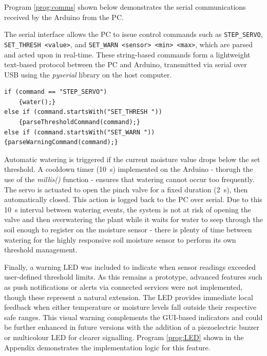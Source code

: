 \documentclass[a4paper,11pt]{article}
\begin{document}
Program \ref{prog:comms} shown below demonstrates the serial communications
received by the Arduino from the PC.

The serial interface allows the PC to issue control commands such as 
\texttt{STEP\_SERVO}, \texttt{SET\_THRESH <value>}, and 
\texttt{SET\_WARN <sensor> <min> <max>}, which are parsed and acted upon 
in real-time.
These string-based commands form a lightweight text-based protocol between 
the PC and Arduino, transmitted via 
serial over USB using the \textit{pyserial} library 
on the host computer. 

\begin{lstlisting}[style=cpp-style, 
caption={Communication with the PC}, label={prog:comms}]
if (command == "STEP_SERVO")
    {water();}
else if (command.startsWith("SET_THRESH "))
    {parseThresholdCommand(command);}
else if (command.startsWith("SET_WARN "))
{parseWarningCommand(command);}
\end{lstlisting}

Automatic watering is triggered if the current moisture value drops below 
the set threshold. A cooldown timer (\SI{10}{\second}) implemented on the Arduino - 
thorugh the use of the \textit{millis()} function -
ensures that watering cannot occur too frequently. 
The servo is actuated to open the 
pinch valve for a fixed duration (\SI{2}{\second}), then automatically closed. 
This action is logged back to the PC over serial.
Due to this \SI{10}{\second} interval between watering events,
the system is not at risk of opening the valve 
and then overwatering the plant while it waits for water
to seep through the soil enough to register on the moisture sensor - 
there is plenty of time between watering for the highly responsive
soil moisture sensor to perform its own threshold management.

Finally, a warning LED was included to indicate when sensor readings 
exceeded user-defined threshold limits. 
As this remains a prototype, advanced features such as push notifications 
or alerts via connected services were not implemented, 
though these represent a natural extension. 
The LED provides immediate local feedback when either temperature or moisture 
levels fall outside their respective safe ranges. 
This visual warning complements the GUI-based indicators and could be further enhanced 
in future versions with the addition of a piezoelectric buzzer 
or multicolour LED for clearer signalling. 
Program \ref{prog:LED} shown in the Appendix demonstrates 
the implementation logic for this feature.
\end{document}
